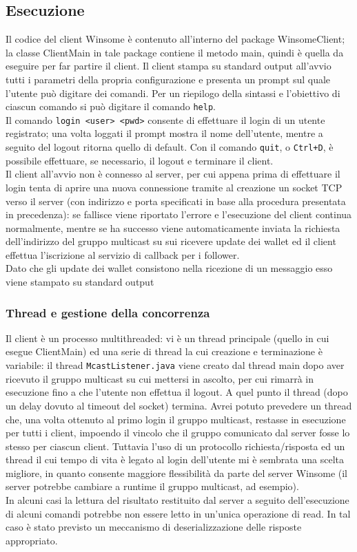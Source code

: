 \subsection{Esecuzione}
Il codice del client Winsome è contenuto all'interno del package WinsomeClient; la classe ClientMain in tale package contiene il metodo main, quindi è quella da eseguire per far partire il client. Il client stampa su standard output all'avvio tutti i parametri della propria configurazione e presenta un prompt sul quale l'utente può digitare dei comandi. Per un riepilogo della sintassi e l'obiettivo di ciascun comando si può digitare il comando \verb|help|.\\
Il comando \verb|login <user> <pwd>| consente di effettuare il login di un utente registrato; una volta loggati il prompt mostra il nome dell'utente, mentre a seguito del logout ritorna quello di default. Con il comando \verb|quit|, o \verb|Ctrl+D|, è possibile effettuare, se necessario, il logout e terminare il client.\\
Il client all'avvio non è connesso al server, per cui appena prima di effettuare il login tenta di aprire una nuova connessione tramite al creazione un socket TCP verso il server (con indirizzo e porta specificati in base alla procedura presentata in precedenza): se fallisce viene riportato l'errore e l'esecuzione del client continua normalmente, mentre se ha successo viene automaticamente inviata la richiesta dell'indirizzo del gruppo multicast su sui ricevere update dei wallet ed il client effettua l'iscrizione al servizio di callback per i follower.\\
Dato che gli update dei wallet consistono nella ricezione di un messaggio esso viene stampato su standard output

\subsubsection{Thread e gestione della concorrenza}
Il client è un processo multithreaded: vi è un thread principale (quello in cui esegue ClientMain) ed una serie di thread la cui creazione e terminazione è variabile: il thread \verb|McastListener.java| viene creato dal thread main dopo aver ricevuto il gruppo multicast su cui mettersi in ascolto, per cui rimarrà in esecuzione fino a che l'utente non effettua il logout. A quel punto il thread (dopo un delay dovuto al timeout del socket) termina. Avrei potuto prevedere un thread che, una volta ottenuto al primo login il gruppo multicast, restasse in esecuzione per tutti i client, impoendo il vincolo che il gruppo comunicato dal server fosse lo stesso per ciascun client. Tuttavia l'uso di un protocollo richiesta/risposta ed un thread il cui tempo di vita è legato al login dell'utente mi è sembrata una scelta migliore, in quanto consente maggiore flessibilità da parte del server Winsome (il server potrebbe cambiare a runtime il gruppo multicast, ad esempio).\\
In alcuni casi la lettura del risultato restituito dal server a seguito dell'esecuzione di alcuni comandi potrebbe non essere letto in un'unica operazione di read. In tal caso
è stato previsto un meccanismo di deserializzazione delle risposte appropriato.

